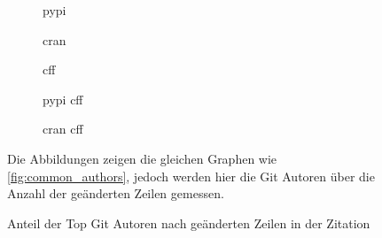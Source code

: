 \begin{figure}
    \begin{subfigure}{.5\textwidth}
        \centering
        
        \caption{\gls{pypi}}
        \label{fig:common_authors_by_files_pypi}
    \end{subfigure}%
    \begin{subfigure}{.5\textwidth}
        \centering
        
        \caption{\gls{cran}}
        \label{fig:common_authors_by_files_cran}
    \end{subfigure}
    \begin{subfigure}{.5\textwidth}
        \centering
        
        \caption{\gls{cff}}
        \label{fig:common_authors_by_files_cff}
    \end{subfigure}%
    \begin{subfigure}{.5\textwidth}
        \centering
        
        \caption{\gls{pypi} \gls{cff}}
        \label{fig:common_authors_by_files_pypi_cff}
    \end{subfigure}
    \centering
    \begin{subfigure}{.5\textwidth}
        \centering
        
        \caption{\gls{cran} \gls{cff}}
        \label{fig:common_authors_by_files_cran_cff}
    \end{subfigure}
    \caption{Anteil der Top Git Autoren nach geänderten Zeilen in der Zitation}
    \label{fig:common_authors_by_files}
    \small
    \raggedright
    Die Abbildungen zeigen die gleichen Graphen wie \autoref{fig:common_authors}, jedoch werden hier die Git Autoren über die Anzahl der geänderten Zeilen gemessen.
\end{figure}

